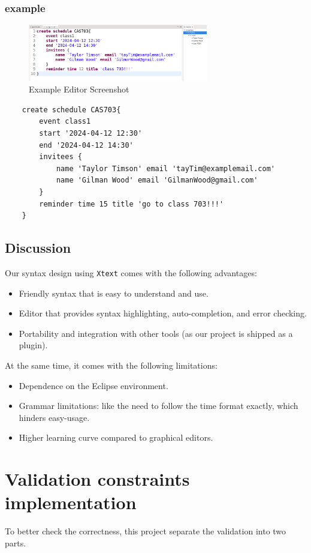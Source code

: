 \documentclass[12pt, letterpaper, twoside]{article}
\begin{document}
\subsubsection{example}
\begin{figure}[H]
    \centering
    \includegraphics[width=0.7\textwidth]{editor_example.png}
    \caption{Example Editor Screenshot}
    \label{fig:class-diagram}
\end{figure}

\begin{verbatim}
    create schedule CAS703{
        event class1 
        start '2024-04-12 12:30'
        end '2024-04-12 14:30'
        invitees {
            name 'Taylor Timson' email 'tayTim@examplemail.com'
            name 'Gilman Wood' email 'GilmanWood@gmail.com'
        }
        reminder time 15 title 'go to class 703!!!'
    }
\end{verbatim}

\subsection{Discussion}
Our syntax design using \texttt{Xtext} comes with the following advantages:
\begin{itemize}
    \item Friendly syntax that is easy to understand and use.
    \item Editor that provides syntax highlighting, auto-completion, and error checking.
    \item Portability and integration with other tools (as our project is shipped as a plugin). 
\end{itemize}
At the same time, it comes with the following limitations:
\begin{itemize}
    \item Dependence on the Eclipse environment.
    \item Grammar limitations: like the need to follow the time format exactly, which hinders easy-usage.
    \item Higher learning curve compared to graphical editors.
\end{itemize}


\newpage
\section{Validation constraints implementation}
To better check the correctness, this project separate the validation into two parts.
\end{document}
